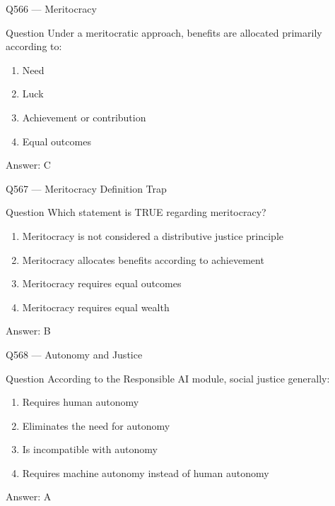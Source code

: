 \documentclass[aspectratio=169,8pt]{beamer}
\begin{document}
\begin{frame}{Q566 --- Meritocracy}
	\begin{block}{Question}
		Under a meritocratic approach, benefits are allocated primarily according to:
		\begin{enumerate}
			\item Need
			\item Luck
			\item Achievement or contribution
			\item Equal outcomes
		\end{enumerate}
	\end{block}
	
	\begin{exampleblock}{Answer: C}\end{exampleblock}
\end{frame}

\begin{frame}{Q567 --- Meritocracy Definition Trap}
	\begin{block}{Question}
		Which statement is TRUE regarding meritocracy?
		\begin{enumerate}
			\item Meritocracy is not considered a distributive justice principle
			\item Meritocracy allocates benefits according to achievement
			\item Meritocracy requires equal outcomes
			\item Meritocracy requires equal wealth
		\end{enumerate}
	\end{block}
	
	\begin{exampleblock}{Answer: B}\end{exampleblock}
\end{frame}

\begin{frame}{Q568 --- Autonomy and Justice}
	\begin{block}{Question}
		According to the Responsible AI module, social justice generally:
		\begin{enumerate}
			\item Requires human autonomy
			\item Eliminates the need for autonomy
			\item Is incompatible with autonomy
			\item Requires machine autonomy instead of human autonomy
		\end{enumerate}
	\end{block}
	
	\begin{exampleblock}{Answer: A}\end{exampleblock}
\end{frame}
\end{document}

